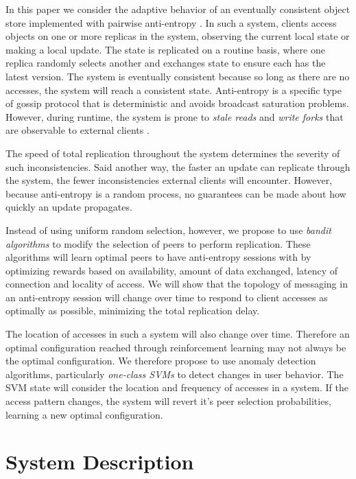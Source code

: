 \documentclass[letterpaper,11pt,onecolumn]{article}
\begin{document}
In this paper we consider the adaptive behavior of an eventually consistent
object store implemented with pairwise anti-entropy \cite{decandia2007dynamo,terry1995managing}.
In such a system, clients access objects on one or more replicas in the
system, observing the current local state or making a local update.
The state is replicated on a routine basis, where one replica randomly
selects another and exchanges state to ensure each has the latest version.
The system is eventually consistent \cite{vogels2009eventually} because so
long as there are no accesses, the system will reach a consistent state.
Anti-entropy is a specific type of gossip protocol \cite{haeupler2015simple}
that is deterministic and avoids broadcast saturation problems.
However, during runtime, the system is prone to \emph{stale reads} and \emph{write forks} that are observable to external clients \cite{bailis2012probabilistically}.

The speed of total replication throughout the system determines the severity
of such inconsistencies.
Said another way, the faster an update can replicate through the system, the
fewer inconsistencies external clients will encounter.
However, because anti-entropy is a random process, no guarantees can be made
about how quickly an update propagates.

Instead of using uniform random selection, however, we propose to use
\emph{bandit algorithms} to modify the selection of peers to perform
replication.
These algorithms will learn optimal peers to have anti-entropy sessions with
by optimizing rewards based on availability, amount of data exchanged,
latency of connection and locality of access.
We will show that the topology of messaging in an anti-entropy session will
change over time to respond to client accesses as optimally as possible,
minimizing the total replication delay.

The location of accesses in such a system will also change over time.
Therefore an optimal configuration reached through reinforcement learning may
not always be the optimal configuration.
We therefore propose to use anomaly detection algorithms, particularly
\emph{one-class SVMs} to detect changes in user behavior.
The SVM state will consider the location and frequency of accesses in a
system.
If the access pattern changes, the system will revert it's peer selection
probabilities, learning a new optimal configuration.

\section*{System Description}
\end{document}

